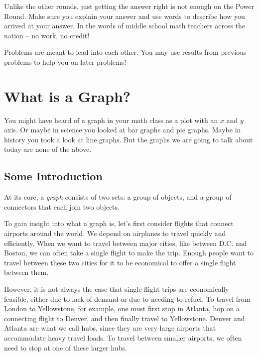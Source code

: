 \documentclass[11pt]{article}
\begin{document}
Unlike the other rounds, just getting the answer right is not enough on the Power Round. Make sure you explain your answer and use words
to describe how you arrived at your answer. In the words of middle school math teachers across the nation -- no work, no credit!

Problems are meant to lead into each other. You may use results from previous problems to help you on later problems!

\section{What is a Graph?}

You might have heard of a graph in your math class as a plot with an $x$ and $y$ axis. Or maybe in science you looked at
bar graphs and pie graphs. Maybe in history you took a look at line graphs. But the graphs we are going to talk about today
are none of the above.

\subsection{Some Introduction}

At its core, a \textit{graph} consists of two sets: a group of objects, and a group of connectors that each join two objects.

To gain insight into what a graph is, let's first consider flights that connect airports around the world.
We depend on airplanes to travel quickly and efficiently. When we want to travel between major cities,
like between D.C. and Boston, we can often take a single flight to make the trip. Enough people want to travel between
these two cities for it to be economical to offer a single flight between them.

However, it is not always the case that single-flight trips are economically feasible, either due to lack of demand
or due to needing to refuel. To travel from London to Yellowstone, for example, one must first stop in Atlanta, hop
on a connecting flight to Denver, and then finally travel to Yellowstone. Denver and Atlanta are what we call
hubs, since they are very large airports that accommodate heavy travel loads. To travel between smaller airports, we often
need to stop at one of these larger hubs.

\begin{center}
\end{center}
\end{document}
